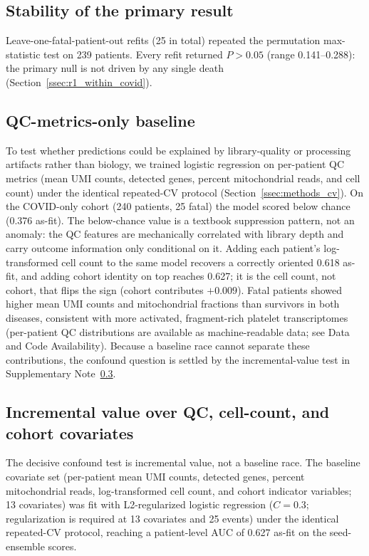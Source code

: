 \documentclass[11pt,a4paper]{article}
\begin{document}
\subsection{Stability of the primary result}
\label{sn:fragility}

Leave-one-fatal-patient-out refits (25 in total) repeated the permutation
max-statistic test on 239 patients. Every refit returned $P > 0.05$ (range
0.141--0.288): the primary null is not driven by any single death
(Section~\ref{ssec:r1_within_covid}).

\subsection{QC-metrics-only baseline}
\label{sn:qc_baseline}

To test whether predictions could be explained by library-quality or
processing artifacts rather than biology, we trained logistic regression on
per-patient QC metrics (mean UMI counts, detected genes, percent mitochondrial
reads, and cell count) under the identical repeated-CV protocol
(Section~\ref{ssec:methods_cv}). On the COVID-only cohort (240 patients, 25
fatal) the model scored below chance (0.376 as-fit). The below-chance value is
a textbook suppression pattern, not an anomaly: the QC features are
mechanically correlated with library depth and carry outcome information only
conditional on it. Adding each patient's log-transformed cell count to the
same model recovers a correctly oriented 0.618 as-fit, and adding cohort
identity on top reaches 0.627; it is the cell count, not cohort, that flips
the sign (cohort contributes $+0.009$). Fatal patients showed higher mean UMI
counts and mitochondrial fractions than survivors in both diseases, consistent
with more activated, fragment-rich platelet transcriptomes (per-patient QC
distributions are available as machine-readable data; see Data and Code
Availability). Because a baseline race cannot separate these contributions,
the confound question is settled by the incremental-value test in
Supplementary Note~\ref{sn:qc_incremental}.

\subsection{Incremental value over QC, cell-count, and cohort covariates}
\label{sn:qc_incremental}

The decisive confound test is incremental value, not a baseline race. The
baseline covariate set (per-patient mean UMI counts, detected genes, percent
mitochondrial reads, log-transformed cell count, and cohort indicator
variables; 13 covariates) was fit with L2-regularized logistic regression
($C = 0.3$; regularization is required at 13 covariates and 25 events) under
the identical repeated-CV protocol, reaching a patient-level AUC of 0.627
as-fit on the seed-ensemble scores.
\end{document}

